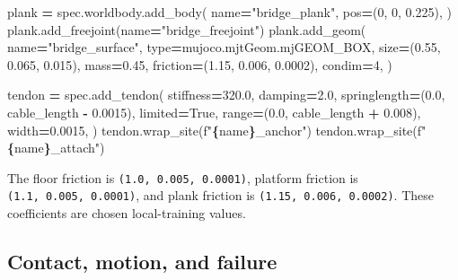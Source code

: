\documentclass[
  american,
  11pt,
  letterpaper,
]{article}
\newenvironment{Shaded}{\begin{snugshade}}{\end{snugshade}}
\newcommand{\BuiltInTok}[1]{#1}
\newcommand{\DecValTok}[1]{\textcolor[rgb]{0.00,0.00,0.81}{#1}}
\newcommand{\FloatTok}[1]{\textcolor[rgb]{0.00,0.00,0.81}{#1}}
\newcommand{\NormalTok}[1]{#1}
\newcommand{\OperatorTok}[1]{\textcolor[rgb]{0.81,0.36,0.00}{\textbf{#1}}}
\newcommand{\SpecialCharTok}[1]{\textcolor[rgb]{0.81,0.36,0.00}{\textbf{#1}}}
\newcommand{\SpecialStringTok}[1]{\textcolor[rgb]{0.31,0.60,0.02}{#1}}
\newcommand{\StringTok}[1]{\textcolor[rgb]{0.31,0.60,0.02}{#1}}
\newcommand{\VariableTok}[1]{\textcolor[rgb]{0.00,0.00,0.00}{#1}}
\renewenvironment{Shaded}{\par\smallskip}{\par\smallskip}
\begin{document}
\begin{Shaded}
\begin{Highlighting}[]
\NormalTok{plank }\OperatorTok{=}\NormalTok{ spec.worldbody.add\_body(}
\NormalTok{    name}\OperatorTok{=}\StringTok{"bridge\_plank"}\NormalTok{,}
\NormalTok{    pos}\OperatorTok{=}\NormalTok{(}\DecValTok{0}\NormalTok{, }\DecValTok{0}\NormalTok{, }\FloatTok{0.225}\NormalTok{),}
\NormalTok{)}
\NormalTok{plank.add\_freejoint(name}\OperatorTok{=}\StringTok{"bridge\_freejoint"}\NormalTok{)}
\NormalTok{plank.add\_geom(}
\NormalTok{    name}\OperatorTok{=}\StringTok{"bridge\_surface"}\NormalTok{,}
    \BuiltInTok{type}\OperatorTok{=}\NormalTok{mujoco.mjtGeom.mjGEOM\_BOX,}
\NormalTok{    size}\OperatorTok{=}\NormalTok{(}\FloatTok{0.55}\NormalTok{, }\FloatTok{0.065}\NormalTok{, }\FloatTok{0.015}\NormalTok{),}
\NormalTok{    mass}\OperatorTok{=}\FloatTok{0.45}\NormalTok{,}
\NormalTok{    friction}\OperatorTok{=}\NormalTok{(}\FloatTok{1.15}\NormalTok{, }\FloatTok{0.006}\NormalTok{, }\FloatTok{0.0002}\NormalTok{),}
\NormalTok{    condim}\OperatorTok{=}\DecValTok{4}\NormalTok{,}
\NormalTok{)}

\NormalTok{tendon }\OperatorTok{=}\NormalTok{ spec.add\_tendon(}
\NormalTok{    stiffness}\OperatorTok{=}\FloatTok{320.0}\NormalTok{,}
\NormalTok{    damping}\OperatorTok{=}\FloatTok{2.0}\NormalTok{,}
\NormalTok{    springlength}\OperatorTok{=}\NormalTok{(}\FloatTok{0.0}\NormalTok{, cable\_length }\OperatorTok{{-}} \FloatTok{0.0015}\NormalTok{),}
\NormalTok{    limited}\OperatorTok{=}\VariableTok{True}\NormalTok{,}
    \BuiltInTok{range}\OperatorTok{=}\NormalTok{(}\FloatTok{0.0}\NormalTok{, cable\_length }\OperatorTok{+} \FloatTok{0.008}\NormalTok{),}
\NormalTok{    width}\OperatorTok{=}\FloatTok{0.0015}\NormalTok{,}
\NormalTok{)}
\NormalTok{tendon.wrap\_site(}\SpecialStringTok{f"}\SpecialCharTok{\{}\NormalTok{name}\SpecialCharTok{\}}\SpecialStringTok{\_anchor"}\NormalTok{)}
\NormalTok{tendon.wrap\_site(}\SpecialStringTok{f"}\SpecialCharTok{\{}\NormalTok{name}\SpecialCharTok{\}}\SpecialStringTok{\_attach"}\NormalTok{)}
\end{Highlighting}
\end{Shaded}

The floor friction is \texttt{(1.0,\ 0.005,\ 0.0001)}, platform friction
is \texttt{(1.1,\ 0.005,\ 0.0001)}, and plank friction is
\texttt{(1.15,\ 0.006,\ 0.0002)}. These coefficients are chosen
local-training values.

\subsection{Contact, motion, and
failure}\label{contact-motion-and-failure}
\end{document}
